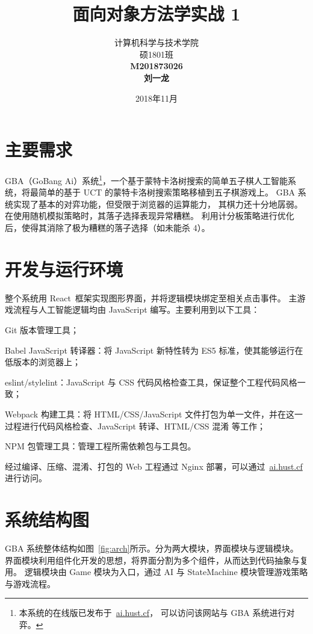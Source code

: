 \documentclass[UTF8,cs4size]{ctexart}
\title{{\LARGE \textbf{面向对象方法学实战 1}}\\  \vspace{7cm}}
\author{计算机科学与技术学院\\ 硕1801班\\ \textbf{M201873026}\\ \textbf{刘一龙}}
\date{2018年11月}
\begin{document}
\maketitle
\newpage
\tableofcontents
\newpage


\section{主要需求}
GBA（GoBang Ai）系统\footnote{本系统的在线版已发布于~\href{http://ai.hust.cf}{ai.hust.cf}，
可以访问该网站与 GBA 系统进行对弈。}，一个基于蒙特卡洛树搜索的简单五子棋人工智能系统，将最简单的基于 UCT 的蒙特卡洛树搜索策略移植到五子棋游戏上。
GBA 系统实现了基本的对弈功能，但受限于浏览器的运算能力，
其棋力还十分地孱弱。在使用随机模拟策略时，其落子选择表现异常糟糕。
利用计分板策略进行优化后，使得其消除了极为糟糕的落子选择（如未能杀 4）。
\clearpage

\section{开发与运行环境}
整个系统用 React~\cite{web:react}框架实现图形界面，并将逻辑模块绑定至相关点击事件。
主游戏流程与人工智能逻辑均由 JavaScript 编写。主要利用到以下工具：

\begin{compactitem}
  \item Git 版本管理工具；
  \item Babel JavaScript 转译器：将 JavaScript 新特性转为 ES5 标准，使其能够运行在低版本的浏览器上；
  \item eslint/stylelint：JavaScript 与 CSS 代码风格检查工具，保证整个工程代码风格一致；
  \item Webpack 构建工具：将 HTML/CSS/JavaScript 文件打包为单一文件，并在这一过程进行代码风格检查、JavaScript 转译、HTML/CSS 混淆 等工作；
  \item NPM 包管理工具：管理工程所需依赖包与工具包。
\end{compactitem}

经过编译、压缩、混淆、打包的 Web 工程通过 Nginx 部署，可以通过~\href{http://ai.hust.cf}{ai.hust.cf}进行访问。

\clearpage

\section{系统结构图}

GBA 系统整体结构如图~\ref{fig:arch}所示。分为两大模块，界面模块与逻辑模块。
界面模块利用组件化开发的思想，将界面分割为多个组件，从而达到代码抽象与复用。
逻辑模块由 Game 模块为入口，通过 AI 与 StateMachine 模块管理游戏策略与游戏流程。
\end{document}
